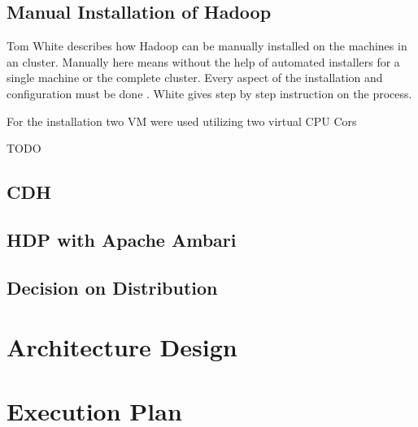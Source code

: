 \subsection{Manual Installation of Hadoop}

Tom White\autocite[][Appendix A]{white2015hadoop} describes how Hadoop can be manually installed on the machines in an cluster. 
Manually here means without the help of automated installers for a single machine or the complete cluster. 
Every aspect of the installation and configuration must be done .
White gives step by step instruction on the process.

For the installation two \acs{VM} were used utilizing two virtual \ac{CPU} Cors

TODO

\subsection{\acl{CDH}}

\subsection{\acl{HDP} with Apache Ambari}

\subsection{Decision on Distribution}

\section{Architecture Design}

\section{Execution Plan}
